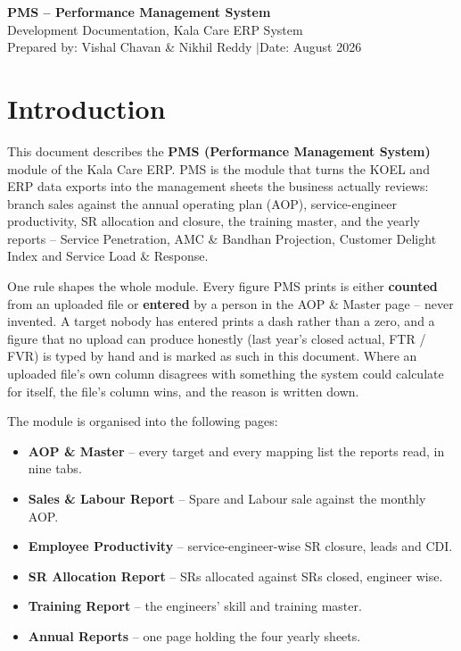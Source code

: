 \documentclass[11pt,a4paper]{article}
\begin{document}
\begin{center}
  {\LARGE\bfseries PMS -- Performance Management System}\\[10pt]
  {\large Development Documentation, Kala Care ERP System}\\[14pt]
  {\normalsize Prepared by: Vishal Chavan \& Nikhil Reddy \quad$|$\quad Date: August 2026}
\end{center}

\vspace{10pt}

\section{Introduction}

This document describes the \textbf{PMS (Performance Management System)} module of the
Kala Care ERP. PMS is the module that turns the KOEL and ERP data exports into the
management sheets the business actually reviews: branch sales against the annual
operating plan (AOP), service-engineer productivity, SR allocation and closure, the
training master, and the yearly reports -- Service Penetration, AMC \& Bandhan
Projection, Customer Delight Index and Service Load \& Response.

One rule shapes the whole module. Every figure PMS prints is either \textbf{counted}
from an uploaded file or \textbf{entered} by a person in the AOP \& Master page --
never invented. A target nobody has entered prints a dash rather than a zero, and a
figure that no upload can produce honestly (last year's closed actual, FTR / FVR) is
typed by hand and is marked as such in this document. Where an uploaded file's own
column disagrees with something the system could calculate for itself, the file's
column wins, and the reason is written down.

The module is organised into the following pages:
\begin{itemize}
  \item \textbf{AOP \& Master} -- every target and every mapping list the reports read,
  in nine tabs.
  \item \textbf{Sales \& Labour Report} -- Spare and Labour sale against the monthly AOP.
  \item \textbf{Employee Productivity} -- service-engineer-wise SR closure, leads and CDI.
  \item \textbf{SR Allocation Report} -- SRs allocated against SRs closed, engineer wise.
  \item \textbf{Training Report} -- the engineers' skill and training master.
  \item \textbf{Annual Reports} -- one page holding the four yearly sheets.
\end{itemize}
\end{document}
